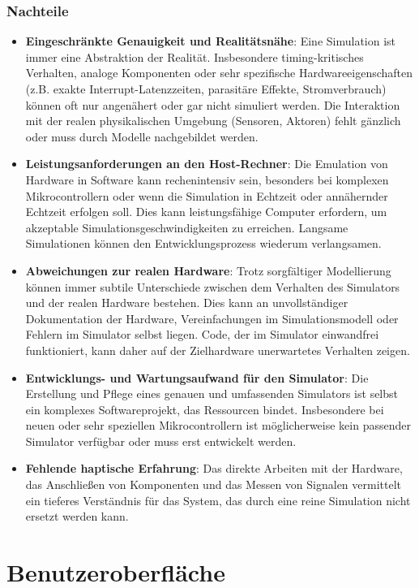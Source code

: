 \subsection*{Nachteile}
\begin{itemize}
    \item \textbf{Eingeschränkte Genauigkeit und Realitätsnähe}: Eine Simulation ist immer eine Abstraktion der Realität. Insbesondere timing-kritisches Verhalten, analoge Komponenten oder sehr spezifische Hardwareeigenschaften (z.B. exakte Interrupt-Latenzzeiten, parasitäre Effekte, Stromverbrauch) können oft nur angenähert oder gar nicht simuliert werden. Die Interaktion mit der realen physikalischen Umgebung (Sensoren, Aktoren) fehlt gänzlich oder muss durch Modelle nachgebildet werden.
    \item \textbf{Leistungsanforderungen an den Host-Rechner}: Die Emulation von Hardware in Software kann rechenintensiv sein, besonders bei komplexen Mikrocontrollern oder wenn die Simulation in Echtzeit oder annähernder Echtzeit erfolgen soll. Dies kann leistungsfähige Computer erfordern, um akzeptable Simulationsgeschwindigkeiten zu erreichen. Langsame Simulationen können den Entwicklungsprozess wiederum verlangsamen.
    \item \textbf{Abweichungen zur realen Hardware}: Trotz sorgfältiger Modellierung können immer subtile Unterschiede zwischen dem Verhalten des Simulators und der realen Hardware bestehen. Dies kann an unvollständiger Dokumentation der Hardware, Vereinfachungen im Simulationsmodell oder Fehlern im Simulator selbst liegen. Code, der im Simulator einwandfrei funktioniert, kann daher auf der Zielhardware unerwartetes Verhalten zeigen.
    \item \textbf{Entwicklungs- und Wartungsaufwand für den Simulator}: Die Erstellung und Pflege eines genauen und umfassenden Simulators ist selbst ein komplexes Softwareprojekt, das Ressourcen bindet. Insbesondere bei neuen oder sehr speziellen Mikrocontrollern ist möglicherweise kein passender Simulator verfügbar oder muss erst entwickelt werden.
    \item \textbf{Fehlende haptische Erfahrung}: Das direkte Arbeiten mit der Hardware, das Anschließen von Komponenten und das Messen von Signalen vermittelt ein tieferes Verständnis für das System, das durch eine reine Simulation nicht ersetzt werden kann.
\end{itemize}
 
\chapter{Benutzeroberfläche}

